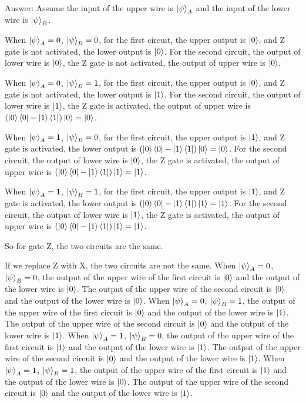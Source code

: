 \documentclass{article}
\begin{document}
\begin{enumerate}
    Answer:
    Assume the input of the upper wire is $\ket{\psi}_A$ and the input of the lower wire is $\ket{\psi}_B$.

    When $\ket{\psi}_A=0$, $\ket{\psi}_B=0$, for the first circuit, the upper output is $\ket{0}$, and Z gate is not activated, the lower output is $\ket{0}$. For the second circuit, the output of lower wire is $\ket{0}$, the Z gate is not activated, the output of upper wire is $\ket{0}$.

    When $\ket{\psi}_A=0$, $\ket{\psi}_B=1$, for the first circuit, the upper output is $\ket{0}$, and Z gate is not activated, the lower output is $\ket{1}$. For the second circuit, the output of lower wire is $\ket{1}$, the Z gate is activated, the output of upper wire is $(\ket{0}\bra{0}-\ket{1}\bra{1})\ket{0}=\ket{0}$.

    When $\ket{\psi}_A=1$, $\ket{\psi}_B=0$, for the first circuit, the upper output is $\ket{1}$, and Z gate is activated, the lower output is $(\ket{0}\bra{0}-\ket{1}\bra{1})\ket{0}=\ket{0}$. For the second circuit, the output of lower wire is $\ket{0}$, the Z gate is activated, the output of upper wire is $(\ket{0}\bra{0}-\ket{1}\bra{1})\ket{1}=\ket{1}$.
    
    When $\ket{\psi}_A=1$, $\ket{\psi}_B=1$, for the first circuit, the upper output is $\ket{1}$, and Z gate is activated, the lower output is $(\ket{0}\bra{0}-\ket{1}\bra{1})\ket{1}=\ket{1}$. For the second circuit, the output of lower wire is $\ket{1}$, the Z gate is activated, the output of upper wire is $(\ket{0}\bra{0}-\ket{1}\bra{1})\ket{1}=\ket{1}$. 
    
    So for gate Z, the two circuits are the same.

    If we replace Z with X, the two circuits are not the same.
    When $\ket{\psi}_A=0$, $\ket{\psi}_B=0$, the output of the upper wire of the first circuit is $\ket{0}$ and the output of the lower wire is $\ket{0}$. The output of the upper wire of the second circuit is $\ket{0}$ and the output of the lower wire is $\ket{0}$.
    When $\ket{\psi}_A=0$, $\ket{\psi}_B=1$, the output of the upper wire of the first circuit is $\ket{0}$ and the output of the lower wire is $\ket{1}$. The output of the upper wire of the second circuit is $\ket{0}$ and the output of the lower wire is $\ket{1}$.
    When $\ket{\psi}_A=1$, $\ket{\psi}_B=0$, the output of the upper wire of the first circuit is $\ket{1}$ and the output of the lower wire is $\ket{1}$. The output of the upper wire of the second circuit is $\ket{0}$ and the output of the lower wire is $\ket{1}$.
    When $\ket{\psi}_A=1$, $\ket{\psi}_B=1$, the output of the upper wire of the first circuit is $\ket{1}$ and the output of the lower wire is $\ket{0}$. The output of the upper wire of the second circuit is $\ket{0}$ and the output of the lower wire is $\ket{1}$.


\end{enumerate}
\end{document}
